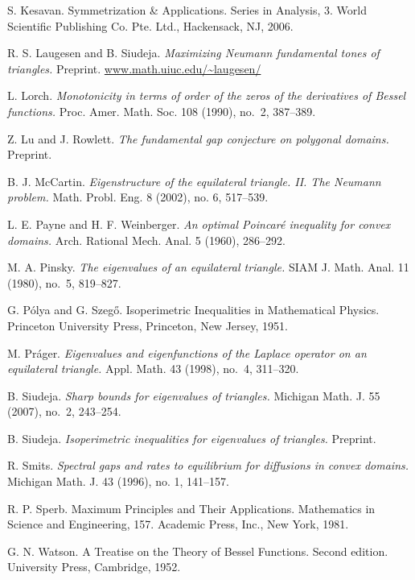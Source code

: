 \documentclass[11pt,reqno]{amsart}
\numberwithin{equation}{section}
\begin{document}
\begin{thebibliography}{99}
 S. Kesavan. Symmetrization \& Applications.
Series in Analysis, 3. World Scientific Publishing Co. Pte. Ltd., Hackensack, NJ, 2006.

 R. S. Laugesen and B. Siudeja.
{\it Maximizing Neumann fundamental tones of triangles.} Preprint. \url{www.math.uiuc.edu/~laugesen/}

L. Lorch.
{\it Monotonicity in terms of order of the zeros of the derivatives of Bessel functions.}
Proc. Amer. Math. Soc. 108 (1990), no.\ 2, 387--389. 

Z. Lu and J. Rowlett. {\it The fundamental gap conjecture on
polygonal domains.} Preprint.

B. J. McCartin. {\it Eigenstructure of the equilateral triangle. II.
The Neumann problem.} Math. Probl. Eng. 8 (2002), no. 6, 517--539.

L. E. Payne and H. F. Weinberger. {\it An optimal Poincar\'{e}
inequality for convex domains.} Arch. Rational Mech. Anal. 5 (1960),
286--292.

 M. A. Pinsky. {\it The eigenvalues of an equilateral triangle.} SIAM J. Math.
Anal. 11 (1980), no.~5, 819--827.

G. P\'{o}lya and G. Szeg\H{o}. Isoperimetric Inequalities in
Mathematical Physics. Princeton University Press, Princeton, New
Jersey, 1951.

 M. Pr\'{a}ger. {\it Eigenvalues and eigenfunctions of the Laplace operator on an equilateral triangle.}  Appl. Math. 43 (1998), no.~4, 311--320.

 B. Siudeja. {\it Sharp bounds for
eigenvalues of triangles.} Michigan Math. J. 55 (2007), no.~2,
243--254.

B. Siudeja. {\it Isoperimetric inequalities for eigenvalues of triangles.} Preprint.

R. Smits. {\it Spectral gaps and rates to equilibrium for diffusions
in convex domains.} Michigan Math. J. 43 (1996), no. 1, 141--157.

R. P. Sperb.
Maximum Principles and Their Applications.
Mathematics in Science and Engineering, 157. Academic Press, Inc., New York, 1981.

G. N. Watson. A Treatise on the Theory of Bessel Functions. Second edition. University Press, Cambridge, 1952.

\end{thebibliography}
\end{document}
